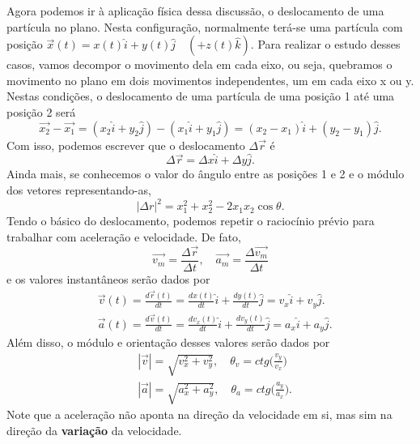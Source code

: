 \documentclass[physics_notes.tex]{subfiles}
\begin{document}
Agora podemos ir à aplicação física dessa discussão, o deslocamento de uma partícula no plano. Nesta configuração, normalmente
terá-se uma partícula com posição $\vec{x}(t) = x(t)\hat{i} + y(t)\hat{j}\quad (+z(t)\hat{k}).$ Para realizar o estudo desses casos,
vamos decompor o movimento dela em cada eixo, ou seja, quebramos o movimento no plano em dois movimentos independentes, um em cada eixo
x ou y. Nestas condições, o deslocamento de uma partícula de uma posição 1 até uma posição 2 será
$$
	\vec{x_{2}} - \vec{x_{1}} = (x_{2}\hat{i} + y_{2}\hat{j}) - (x_{1}\hat{i}+y_{1}\hat{j}) = (x_{2}-x_{1})\hat{i} + (y_{2}-y_{1})\hat{j}.
$$
Com isso, podemos escrever que o deslocamento $\Delta \vec{r}$ é
$$
	\Delta \vec{r} = \Delta x\hat{i} + \Delta y\hat{j}.
$$
Ainda mais, se conhecemos o valor do ângulo entre as posições 1 e 2 e o módulo dos vetores representando-as,
$$
	|\Delta r|^{2} = x_{1}^{2} + x_{2}^{2} - 2x_{1}x_{2}\cos{\theta}.
$$
Tendo o básico do deslocamento, podemos repetir o raciocínio prévio para trabalhar com aceleração e velocidade. De fato,
$$
	\vec{v_{m}} = \frac{\Delta \vec{r}}{\Delta t}, \quad \vec{a_{m}} = \frac{\Delta \vec{v_{m}}}{\Delta t}
$$
e os valores instantâneos serão dados por
\begin{align*}
	 & \vec{v}(t) = \frac{d \vec{r}(t)}{dt} = \frac{d x(t)}{dt}\hat{i} + \frac{d y(t)}{dt}\hat{j} = v_{x}\hat{i} + v_{y}\hat{j}.         \\
	 & \vec{a}(t) = \frac{d \vec{v}(t)}{dt} = \frac{d v_{x}(t)}{dt}\hat{i} + \frac{d v_{y}(t)}{dt}\hat{j} = a_{x}\hat{i} + a_{y}\hat{j}.
\end{align*}
Além disso, o módulo e orientação desses valores serão dados por
\begin{align*}
	 & |\vec{v}| = \sqrt{v_{x}^{2}+v_{y}^{2}},\quad \theta_{v} = ctg\biggl(\frac{v_{y}}{v_{x}}\biggr)  \\
	 & |\vec{a}| = \sqrt{a_{x}^{2}+a_{y}^{2}},\quad \theta_{a} = ctg\biggl(\frac{a_{y}}{a_{x}}\biggr).
\end{align*}
Note que a aceleração não aponta na direção da velocidade em si, mas sim na direção da \textbf{variação} da velocidade.
\end{document}
